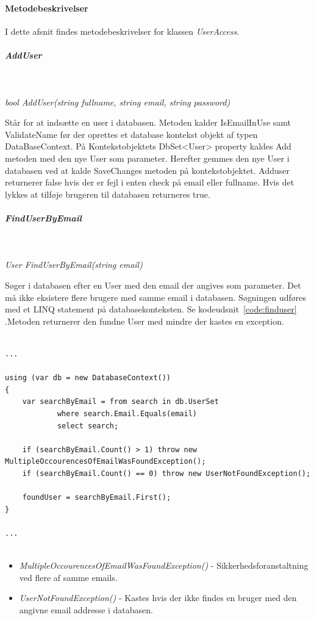 \paragraph{Metodebeskrivelser}
I dette afsnit findes metodebeskrivelser for klassen \textit{UserAccess}.

\subparagraph{AddUser}\

\textit{bool AddUser(string fullname, string email, string password)}

Står for at indsætte en user i databasen. Metoden kalder IsEmailInUse samt ValidateName før der oprettes et database kontekst objekt af typen DataBaseContext. På Kontekstobjektets DbSet<User> property kaldes Add metoden med den nye User som parameter. Herefter gemmes den nye User i databasen ved at kalde SaveChanges metoden på kontekstobjektet. Adduser returnerer false hvis der er fejl i enten check på email eller fullname. Hvis det lykkes at tilføje brugeren til databasen returneres true.

\subparagraph{FindUserByEmail}\

\textit{User FindUserByEmail(string email)}

Søger i databasen efter en User med den email der angives som parameter. Det må ikke eksistere flere brugere med samme email i databasen. Søgningen udføres med et LINQ statement på databasekonteksten. Se kodeudsnit~\ref{code:finduser} .Metoden returnerer den fundne User med mindre der kastes en exception.

\begin{lstlisting}[caption=Kodeudsnit fra metoden FindUserByEmail, label=code:finduser]

...

using (var db = new DatabaseContext())
{
	var searchByEmail = from search in db.UserSet
			where search.Email.Equals(email)
			select search;

	if (searchByEmail.Count() > 1) throw new    MultipleOccourencesOfEmailWasFoundException();
	if (searchByEmail.Count() == 0) throw new UserNotFoundException();

	foundUser = searchByEmail.First();
}

...
	
\end{lstlisting}

\begin{itemize}
	\item \textit{MultipleOccourencesOfEmailWasFoundException()} - Sikkerhedsforanstaltning ved flere af samme emails.
	\item \textit{UserNotFoundException()} - Kastes hvis der ikke findes en bruger med den angivne email addresse i databasen.
\end{itemize}


